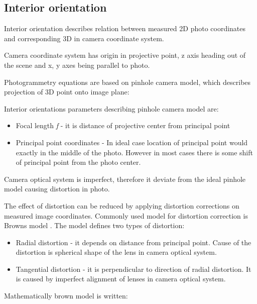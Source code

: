 \documentclass[a4paper,12pt]{report}
\newcommand{\escal}[1]{
{\it #1}
}
\begin{document}
\subsection{Interior orientation}

Interior orientation describes relation between measured 2D photo coordinates 
and corresponding 3D in camera coordinate system.

Camera coordinate system has origin in projective point, z axis heading out of the scene  and x, y axes being parallel to photo. 

Photogrammetry equations are based on pinhole camera model, which describes projection of 3D point onto image plane:

Interior orientations parameters describing pinhole camera model are:
\begin{itemize}
  \item Focal length \escal{f} - it is distance of projective center from principal point
  \item Principal point coordinates - In ideal case location of principal point would exactly in the middle 
	of the photo.  
	However in most cases there is some shift of principal point from the photo center.
\end{itemize}

Camera optical system is imperfect, therefore it deviate from the ideal pinhole model  
 causing distortion in photo.

The effect of distortion can be reduced by applying distortion corrections on measured image coordinates. Commonly 
used model for distortion correction is Browns model \cite{brown1966distortion}.
The model defines two types of distortion:
\begin{itemize}
  \item Radial distortion - it depends on distance from principal point. Cause of the distortion is spherical shape of the 
  lens in camera optical system.
  \item Tangential distortion - it is perpendicular to direction of radial distortion. It is caused by 
       imperfect alignment of lenses in camera optical system.
\end{itemize}

Mathematically brown model is written:
\end{document}
